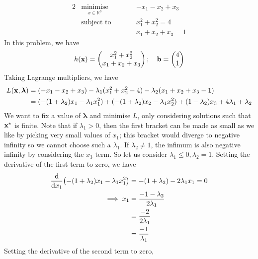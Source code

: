 \begin{example}
	\begin{alignat*}{2}
		 & \underset{x \in \mathbb R^3}{\text{minimise}} & \qquad & -x_1 -x_2 + x_3     \\
		 & \text{subject to}                             &        & x_1^2 + x_2^2 = 4   \\
		 &                                               &        & x_1 + x_2 + x_3 = 1
	\end{alignat*}
	In this problem, we have
	\[
		h(\vb x) = \begin{pmatrix}
			x_1^2 + x_2^2 \\ x_1 + x_2 + x_3
		\end{pmatrix};\quad \vb b = \begin{pmatrix}
			4 \\ 1
		\end{pmatrix}
	\]
	Taking Lagrange multipliers, we have
	\begin{align*}
		L(\vb x, \bm\lambda) & = (-x_1 - x_2 + x_3) - \lambda_1 (x_1^2 + x_2^2 - 4) - \lambda_2(x_1+x_2 + x_3 - 1)                                               \\
		                     & = (-(1+\lambda_2) x_1 - \lambda_1 x_1^2) + (-(1 + \lambda_2)x_2 - \lambda_1 x_2^2) + (1 - \lambda_2)x_3 + 4 \lambda_1 + \lambda_2
	\end{align*}
	We want to fix a value of \(\bm \lambda\) and minimise \(L\), only considering solutions such that \(\vb x^\star\) is finite.
	Note that if \(\lambda_1 > 0\), then the first bracket can be made as small as we like by picking very small values of \(x_1\); this bracket would diverge to negative infinity so we cannot choose such a \(\lambda_1\).
	If \(\lambda_2 \neq 1\), the infimum is also negative infinity by considering the \(x_3\) term.
	So let us consider \(\lambda_1 \leq 0, \lambda_2 = 1\).
	Setting the derivative of the first term to zero, we have
	\begin{align*}
		\dv{x_1} (-(1+\lambda_2) x_1 - \lambda_1 x_1^2) & = -(1+\lambda_2) - 2 \lambda_1 x_1 = 0 \\
		\implies x_1                                    & = \frac{-1 - \lambda_2}{2\lambda_1}    \\
		                                                & = \frac{-2}{2\lambda_1}                \\
		                                                & = \frac{-1}{\lambda_1}
	\end{align*}
	Setting the derivative of the second term to zero,

\end{example}
